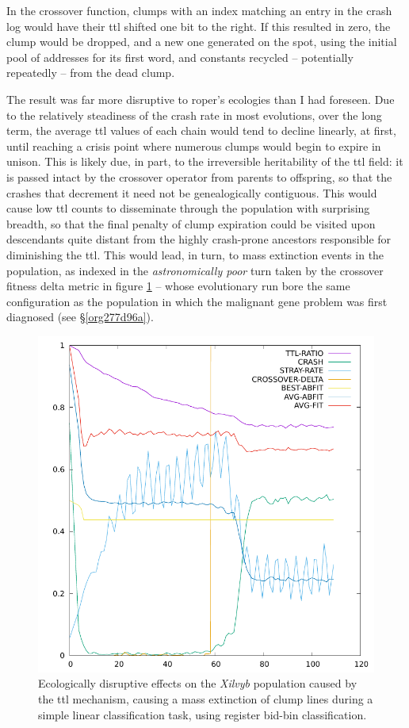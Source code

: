 \documentclass[12pt,glossary]{dalthesis}
\begin{document}
In the crossover function, clumps with an index matching an entry in the crash log
would have their \gls{ttl} shifted one bit to the right. If this resulted in zero, the
clump would be dropped, and a new one generated on the spot, using the initial pool
of addresses for its first word, and constants recycled -- potentially repeatedly -- from
the dead clump. 

The result was far more disruptive to \gls{roper}'s ecologies than I had foreseen. 
Due to the relatively steadiness of the crash rate in most evolutions, over the
long term, the average \gls{ttl} values of each chain would tend to decline 
linearly, at first, until reaching a crisis point where numerous clumps would begin
to expire in unison. 
This is likely due, in part, to the irreversible heritability
of the \gls{ttl} field: it is passed intact by the crossover operator from parents to 
offspring, so that the crashes that decrement it need not be genealogically
contiguous. This would cause low \gls{ttl} counts to disseminate through the
population with surprising breadth, so that the final penalty of clump expiration
could be visited upon descendants quite distant from the highly crash-prone
ancestors responsible for diminishing the \gls{ttl}. 
This would lead, in turn, to mass extinction events in the population, as indexed in
the \emph{astronomically poor} turn taken by the crossover fitness delta metric in 
figure \ref{fig:orga1ffbe8} -- whose evolutionary run bore the same configuration as the population
in which the malignant gene problem was first diagnosed (see \S \ref{org277d96a}).  

\begin{figure}[htbp]
\centering
\includegraphics[width=.9\linewidth]{../images/plots/xilvyb.pdf}
\caption{\label{fig:orga1ffbe8}
Ecologically disruptive effects on the \emph{Xilvyb} population caused by the \gls{ttl} mechanism, causing a mass extinction of clump lines during a simple linear classification task, using register bid-bin classification.}
\end{figure}
\end{document}
